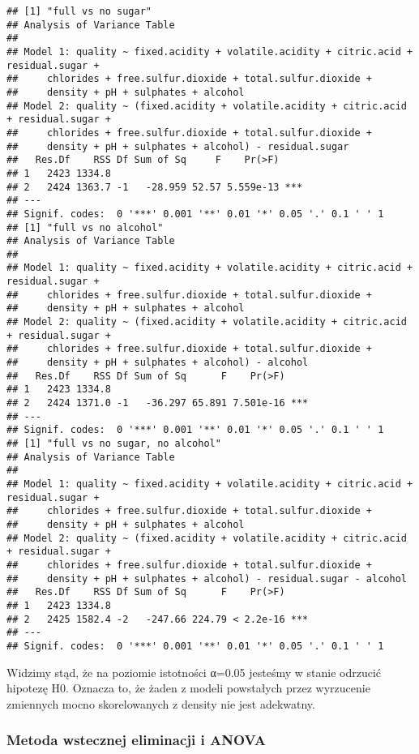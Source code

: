 \documentclass[
]{article}
\begin{document}
\begin{verbatim}
## [1] "full vs no sugar"
## Analysis of Variance Table
## 
## Model 1: quality ~ fixed.acidity + volatile.acidity + citric.acid + residual.sugar + 
##     chlorides + free.sulfur.dioxide + total.sulfur.dioxide + 
##     density + pH + sulphates + alcohol
## Model 2: quality ~ (fixed.acidity + volatile.acidity + citric.acid + residual.sugar + 
##     chlorides + free.sulfur.dioxide + total.sulfur.dioxide + 
##     density + pH + sulphates + alcohol) - residual.sugar
##   Res.Df    RSS Df Sum of Sq     F    Pr(>F)    
## 1   2423 1334.8                                 
## 2   2424 1363.7 -1   -28.959 52.57 5.559e-13 ***
## ---
## Signif. codes:  0 '***' 0.001 '**' 0.01 '*' 0.05 '.' 0.1 ' ' 1
## [1] "full vs no alcohol"
## Analysis of Variance Table
## 
## Model 1: quality ~ fixed.acidity + volatile.acidity + citric.acid + residual.sugar + 
##     chlorides + free.sulfur.dioxide + total.sulfur.dioxide + 
##     density + pH + sulphates + alcohol
## Model 2: quality ~ (fixed.acidity + volatile.acidity + citric.acid + residual.sugar + 
##     chlorides + free.sulfur.dioxide + total.sulfur.dioxide + 
##     density + pH + sulphates + alcohol) - alcohol
##   Res.Df    RSS Df Sum of Sq      F    Pr(>F)    
## 1   2423 1334.8                                  
## 2   2424 1371.0 -1   -36.297 65.891 7.501e-16 ***
## ---
## Signif. codes:  0 '***' 0.001 '**' 0.01 '*' 0.05 '.' 0.1 ' ' 1
## [1] "full vs no sugar, no alcohol"
## Analysis of Variance Table
## 
## Model 1: quality ~ fixed.acidity + volatile.acidity + citric.acid + residual.sugar + 
##     chlorides + free.sulfur.dioxide + total.sulfur.dioxide + 
##     density + pH + sulphates + alcohol
## Model 2: quality ~ (fixed.acidity + volatile.acidity + citric.acid + residual.sugar + 
##     chlorides + free.sulfur.dioxide + total.sulfur.dioxide + 
##     density + pH + sulphates + alcohol) - residual.sugar - alcohol
##   Res.Df    RSS Df Sum of Sq      F    Pr(>F)    
## 1   2423 1334.8                                  
## 2   2425 1582.4 -2   -247.66 224.79 < 2.2e-16 ***
## ---
## Signif. codes:  0 '***' 0.001 '**' 0.01 '*' 0.05 '.' 0.1 ' ' 1
\end{verbatim}

Widzimy stąd, że na poziomie istotności α=0.05 jesteśmy w stanie
odrzucić hipotezę H0. Oznacza to, że żaden z modeli powstałych przez
wyrzucenie zmiennych mocno skorelowanych z density nie jest adekwatny.

\subsubsection{Metoda wstecznej eliminacji i
ANOVA}\label{metoda-wstecznej-eliminacji-i-anova}
\end{document}
